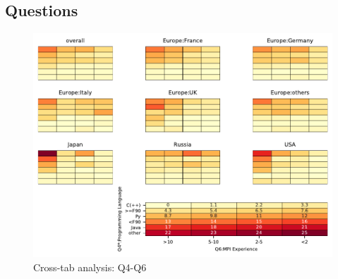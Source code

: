 
\subsection{Questions}


\begin{figure}
\begin{center}
\includegraphics[width=12cm]{../pdfs/Q4-Q6.pdf}
\caption{Cross-tab analysis: Q4-Q6}
\label{fig:Q4-Q6}
\end{center}
\end{figure}
